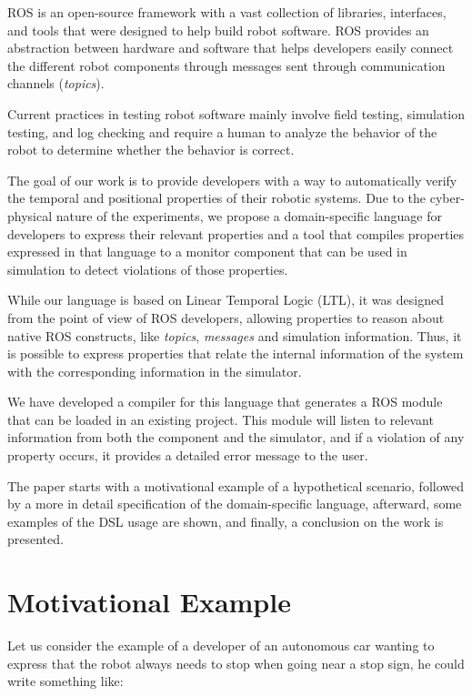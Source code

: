 \documentclass[runningheads]{llncs}
\begin{document}
ROS is an open-source framework with a vast collection of libraries, interfaces, and tools that were designed to help build robot software. ROS provides an abstraction between hardware and software that helps developers easily connect the different robot components through messages sent through communication channels (\textit{topics}).

Current practices in testing robot software mainly involve field testing, simulation testing, and log checking and require a human to analyze the behavior of the robot to determine whether the behavior is correct.

The goal of our work is to provide developers with a way to automatically verify the temporal and positional properties of their robotic systems. Due to the cyber-physical nature of the experiments, we propose a domain-specific language for developers to express their relevant properties and a tool that compiles properties expressed in that language to a monitor component that can be used in simulation to detect violations of those properties.

While our language is based on Linear Temporal Logic (LTL), it was designed from the point of view of ROS developers, allowing properties to reason about native ROS constructs, like \textit{topics}, \textit{messages} and simulation information. Thus, it is possible to express properties that relate the internal information of the system with the corresponding information in the simulator.

We have developed a compiler for this language that generates a ROS module that can be loaded in an existing project. This module will listen to relevant information from both the component and the simulator, and if a violation of any property occurs, it provides a detailed error message to the user.

The paper starts with a motivational example of a hypothetical scenario, followed by a more in detail specification of the domain-specific language, afterward, some examples of the DSL usage are shown, and finally, a conclusion on the work is presented.

\section{Motivational Example}

Let us consider the example of a developer of an autonomous car wanting to express that the robot always needs to stop when going near a stop sign, he could write something like:
\end{document}
